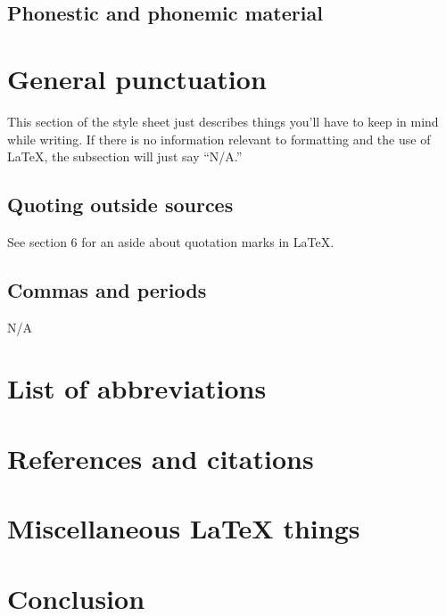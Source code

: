 \documentclass[12pt]{article}
\begin{document}
	\subsection{Phonestic and phonemic material}
	
	\section{General punctuation}
	This section of the style sheet just describes things you'll have to keep in mind while writing. If there is no information relevant to formatting and the use of LaTeX, the subsection will just say ``N/A.''
	
	\subsection{Quoting outside sources}
	See section 6 for an aside about quotation marks in LaTeX.
	
	\subsection{Commas and periods}
	N/A
	
	\section{List of abbreviations}
	
	\section{References and citations}
	
	\section{Miscellaneous LaTeX things}
	
	\section{Conclusion}
	
\end{document}
